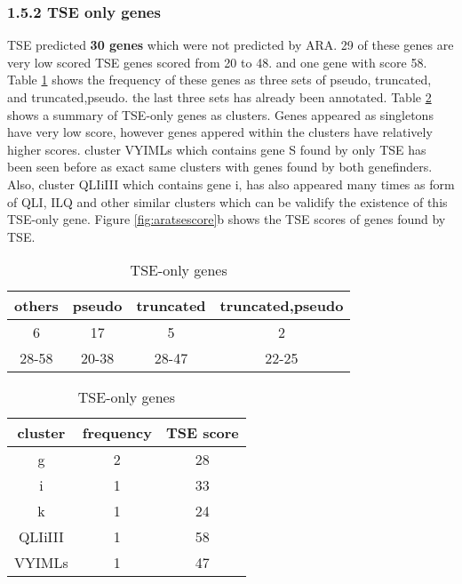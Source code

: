\documentclass[table,
12pt, %
a4paper, %
oneside, %
headinclude,footinclude, %
BCOR5mm, %
]{scrartcl}
\begin{document}
\subsubsection{1.5.2 TSE only genes}
TSE predicted \textbf{30 genes} which were not predicted by ARA. 29 of these genes are very low scored TSE genes scored from 20 to 48. and one gene with score 58. Table \ref{table:tse1} shows the frequency of these genes as three sets of pseudo, truncated, and truncated,pseudo. the last three sets has already been annotated. Table \ref{table:tse2} shows a summary of TSE-only genes as clusters. Genes appeared as singletons have very low score, however genes appered within the clusters have relatively higher scores. cluster VYIMLs which contains gene S found by only TSE has been seen before as exact same clusters with genes found by both genefinders. Also, cluster QLIiIII which contains gene i, has also appeared many times as form of QLI, ILQ and other similar clusters which can be validify the existence of this TSE-only gene. Figure \ref{fig:aratsescore}b shows the TSE scores of genes found by TSE.


\begin{table}[htbp]
  \caption{TSE-only genes}
  \begin{adjustbox}{width=7cm,center}
    \begin{tabular}{|cccc|}
      \hline
      others & pseudo & truncated & truncated,pseudo \\
      \hline
      6      & 17     & 5         & 2                \\
      \hline
      28-58  & 20-38  & 28-47     & 22-25            \\
      \hline
    \end{tabular}
    \label{table:tse1}
  \end{adjustbox}
\end{table}


\begin{table}[htbp]
  \caption{TSE-only genes}
  \begin{adjustbox}{width=5cm,center}
    \begin{tabular}{|ccc|}
      \hline
      cluster & frequency & TSE score \\
      \hline\hline
      g       & 2         & 28        \\
      i       & 1         & 33        \\
      k       & 1         & 24        \\
      QLIiIII & 1         & 58        \\
      VYIMLs  & 1         & 47        \\
      \hline
    \end{tabular}
    \label{table:tse2}
  \end{adjustbox}
\end{table}
\end{document}
